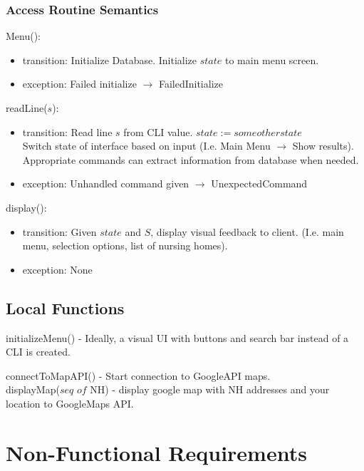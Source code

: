 \documentclass[12pt]{article}
\begin{document}
\subsubsection* {Access Routine Semantics}
\noindent Menu():
\begin{itemize}
\item transition: Initialize Database. Initialize $state$ to main menu screen.
\item exception: Failed initialize $\rightarrow$ FailedInitialize
\end{itemize}

\noindent readLine($s$):
\begin{itemize}
\item transition: Read line $s$ from CLI value. $state := some other state$ \\ Switch state of interface based on input (I.e. Main Menu $\rightarrow$ Show results). Appropriate commands can extract information from database when needed.
\item exception: Unhandled command given $\rightarrow$ UnexpectedCommand
\end{itemize}


\noindent display():
\begin{itemize}
\item transition: Given $state$ and $S$, display visual feedback to client. (I.e. main menu, selection options, list of nursing homes).
\item exception: None
\end{itemize}

\subsection*{Local Functions}
\noindent initializeMenu() - Ideally, a visual UI with buttons and search bar instead of a CLI is created.

\noindent connectToMapAPI() - Start connection to GoogleAPI maps. \\
\noindent displayMap($\textit{seq of }$NH) - display google map with NH addresses and your location to GoogleMaps API.



\newpage
\section{Non-Functional Requirements}
\end{document}
